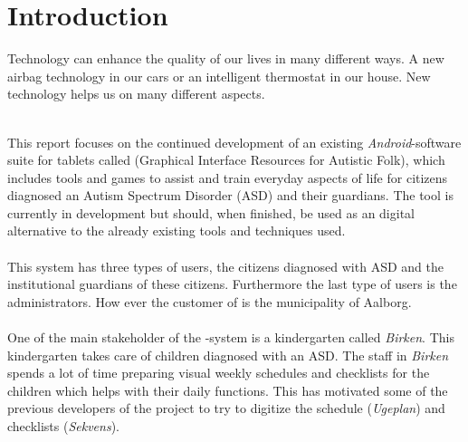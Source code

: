 \chapter{Introduction}
\label{cha:introduction}

Technology can enhance the quality of our lives in many different ways. A new airbag technology in our cars or an intelligent thermostat in our house. New technology helps us on many different aspects. 
\\\\

This report focuses on the continued development of an existing \emph{Android}-software suite for tablets called \giraf (Graphical Interface Resources for Autistic Folk), which includes tools and games to assist and train everyday aspects of life for citizens diagnosed an Autism Spectrum Disorder (ASD) \parencite{asd} and their guardians. The tool is currently in development but should, when finished, be used as an digital alternative to the already existing tools and techniques used. 
\\\\
This system has three types of users, the citizens diagnosed with ASD and the institutional guardians of these citizens. Furthermore the last type of users is the administrators. How ever the customer of \giraf is the municipality of Aalborg.
\\\\
One of the main stakeholder of the \giraf-system is a kindergarten called \emph{Birken}. This kindergarten takes care of children diagnosed with an ASD. The staff in \emph{Birken} spends a lot of time preparing visual weekly schedules and checklists for the children which helps with their daily functions. This has motivated some of the previous developers of the \giraf project to try to digitize the schedule (\emph{Ugeplan}) and checklists (\emph{Sekvens}). 
\\\\



